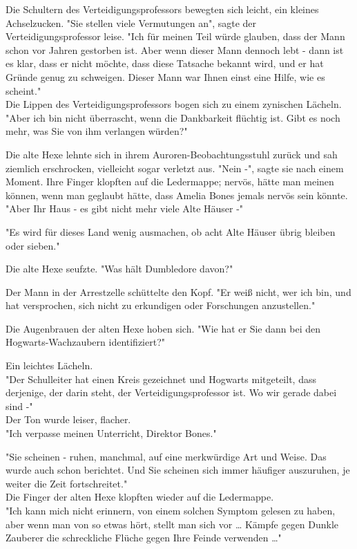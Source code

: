 {Die Schultern des Verteidigungsprofessors bewegten sich leicht, ein kleines Achselzucken. "Sie stellen viele Vermutungen an", sagte der Verteidigungsprofessor leise. "Ich für meinen Teil würde glauben, dass der Mann schon vor Jahren gestorben ist. Aber wenn dieser Mann dennoch lebt - dann ist es klar, dass er nicht möchte, dass diese Tatsache bekannt wird, und er hat Gründe genug zu schweigen. Dieser Mann war Ihnen einst eine Hilfe, wie es scheint."\\ Die Lippen des Verteidigungsprofessors bogen sich zu einem zynischen Lächeln. "Aber ich bin nicht überrascht, wenn die Dankbarkeit flüchtig ist. Gibt es noch mehr, was Sie von ihm verlangen würden?"

Die alte Hexe lehnte sich in ihrem Auroren-Beobachtungsstuhl zurück und sah ziemlich erschrocken, vielleicht sogar verletzt aus. "Nein -", sagte sie nach einem Moment. Ihre Finger klopften auf die Ledermappe; nervös, hätte man meinen können, wenn man geglaubt hätte, dass Amelia Bones jemals nervös sein könnte. "Aber Ihr Haus - es gibt nicht mehr viele Alte Häuser -"

"Es wird für dieses Land wenig ausmachen, ob acht Alte Häuser übrig bleiben oder sieben."

Die alte Hexe seufzte. "Was hält Dumbledore davon?"

Der Mann in der Arrestzelle schüttelte den Kopf. "Er weiß nicht, wer ich bin, und hat versprochen, sich nicht zu erkundigen oder Forschungen anzustellen."

Die Augenbrauen der alten Hexe hoben sich. "Wie hat er Sie dann bei den Hogwarts-Wachzaubern identifiziert?"

Ein leichtes Lächeln.\\ "Der Schulleiter hat einen Kreis gezeichnet und Hogwarts mitgeteilt, dass derjenige, der darin steht, der Verteidigungsprofessor ist. Wo wir gerade dabei sind -"\\ Der Ton wurde leiser, flacher.\\ "Ich verpasse meinen Unterricht, Direktor Bones."

"Sie scheinen - ruhen, manchmal, auf eine merkwürdige Art und Weise. Das wurde auch schon berichtet. Und Sie scheinen sich immer häufiger auszuruhen, je weiter die Zeit fortschreitet."\\ Die Finger der alten Hexe klopften wieder auf die Ledermappe.\\ "Ich kann mich nicht erinnern, von einem solchen Symptom gelesen zu haben, aber wenn man von so etwas hört, stellt man sich vor … Kämpfe gegen Dunkle Zauberer die schreckliche Flüche gegen Ihre Feinde verwenden …"

}
